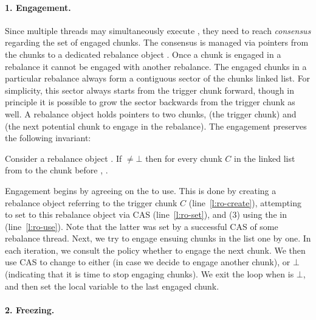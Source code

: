 \paragraph{1. Engagement.}



Since multiple threads may simultaneously execute , they need to reach \emph{consensus} regarding
the set of engaged chunks. The consensus is managed via pointers from the chunks to a dedicated rebalance object .
Once a chunk is engaged in a rebalance it cannot be engaged with another rebalance.
The engaged chunks in a particular rebalance always form a contiguous sector of the chunks linked list.
For simplicity, this sector always starts from the trigger chunk forward,  though in principle it is possible
to grow the sector backwards from the trigger chunk as well.
A rebalance object holds pointers to two chunks,  (the trigger chunk) and  
(the next potential chunk to engage in the rebalance).
The engagement  preserves the following invariant:
\begin{invariant}
Consider a rebalance object .
If ${\not=}{\bot}$ then
for every chunk $C$ in the linked list from  to the chunk before , .
\end{invariant}


Engagement
begins by agreeing on the  to use. This is done by creating a rebalance object
 referring to the trigger chunk $C$ (line~\ref{l:ro-create}), attempting to set 
to this  rebalance object via CAS (line~\ref{l:ro-set}), and (3) using the  in  (line~\ref{l:ro-use}).
Note that the latter was set by a successful CAS of some rebalance thread.
Next, we try to engage ensuing chunks in the list one by one.
In each iteration, we consult the policy whether to engage the next chunk.
We then use CAS to change  to either  (in case we decide to engage another chunk), or $\bot$ (indicating
that it is time to stop engaging chunks).
We exit the loop when  is $\bot$, and then set the local variable  
to  the last engaged chunk.


\paragraph{2. Freezing.}

